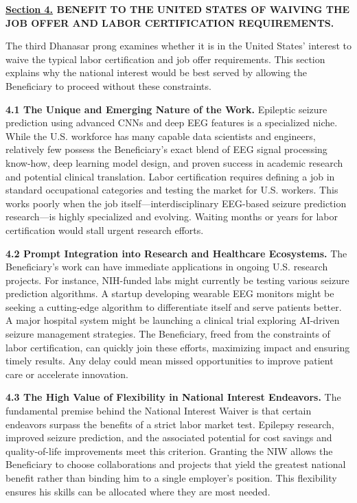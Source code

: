\documentclass{article}
\begin{document}
\clearpage

{\bf \underline{Section 4.} BENEFIT TO THE UNITED STATES OF WAIVING THE JOB OFFER AND LABOR CERTIFICATION REQUIREMENTS. }

The third Dhanasar prong examines whether it is in the United States’ interest to waive the typical labor certification and job offer requirements. This section explains why the national interest would be best served by allowing the Beneficiary to proceed without these constraints.

{\bf 4.1 The Unique and Emerging Nature of the Work.}
Epileptic seizure prediction using advanced CNNs and deep EEG features is a specialized niche. While the U.S. workforce has many capable data scientists and engineers, relatively few possess the Beneficiary’s exact blend of EEG signal processing know-how, deep learning model design, and proven success in academic research and potential clinical translation. Labor certification requires defining a job in standard occupational categories and testing the market for U.S. workers. This works poorly when the job itself—interdisciplinary EEG-based seizure prediction research—is highly specialized and evolving. Waiting months or years for labor certification would stall urgent research efforts.

{\bf 4.2 Prompt Integration into Research and Healthcare Ecosystems.}
The Beneficiary’s work can have immediate applications in ongoing U.S. research projects. For instance, NIH-funded labs might currently be testing various seizure prediction algorithms. A startup developing wearable EEG monitors might be seeking a cutting-edge algorithm to differentiate itself and serve patients better. A major hospital system might be launching a clinical trial exploring AI-driven seizure management strategies. The Beneficiary, freed from the constraints of labor certification, can quickly join these efforts, maximizing impact and ensuring timely results. Any delay could mean missed opportunities to improve patient care or accelerate innovation.

{\bf 4.3 The High Value of Flexibility in National Interest Endeavors.}
The fundamental premise behind the National Interest Waiver is that certain endeavors surpass the benefits of a strict labor market test. Epilepsy research, improved seizure prediction, and the associated potential for cost savings and quality-of-life improvements meet this criterion. Granting the NIW allows the Beneficiary to choose collaborations and projects that yield the greatest national benefit rather than binding him to a single employer’s position. This flexibility ensures his skills can be allocated where they are most needed.
\end{document}
